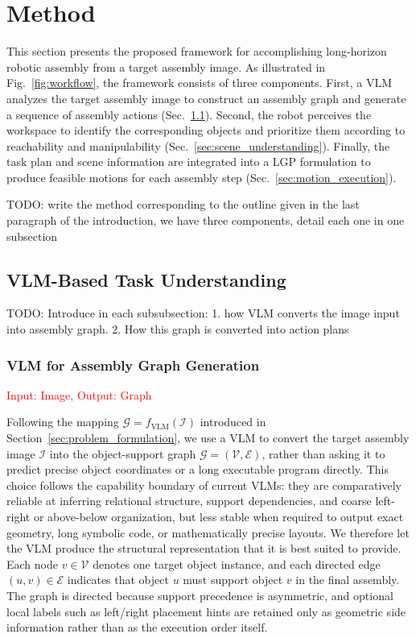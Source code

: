 \documentclass[journal]{IEEEtran}
\newcommand{\todo}[1]{{\color{red}TODO: #1}}
\begin{document}
\section{Method}


This section presents the proposed framework for accomplishing long-horizon robotic assembly from a target assembly image. 
As illustrated in Fig.~\ref{fig:workflow}, the framework consists of three components. 
First, a VLM analyzes the target assembly image to construct an assembly graph and generate a sequence of assembly actions (Sec.~\ref{sec:task_understanding}). 
Second, the robot perceives the workspace to identify the corresponding objects and prioritize them according to reachability and manipulability (Sec.~\ref{sec:scene_understanding}). 
Finally, the task plan and scene information are integrated into a LGP formulation to produce feasible motions for each assembly step (Sec.~\ref{sec:motion_execution}). 

\todo{write the method corresponding to the outline given in the last paragraph of the introduction, we have three components, detail each one in one subsection}

\subsection{VLM-Based Task Understanding}
\label{sec:task_understanding}

\todo{Introduce in each subsubsection: 1. how VLM converts the image input into assembly graph. 2. How this graph is converted into action plans}

\subsubsection{VLM for Assembly Graph Generation}
\textcolor{red}{Input: Image, Output: Graph}

Following the mapping $\mathcal{G}=f_{\mathrm{VLM}}(\mathcal{I})$ introduced in
Section~\ref{sec:problem_formulation}, we use a VLM to convert the target
assembly image $\mathcal{I}$ into the object-support graph
$\mathcal{G}=(\mathcal{V},\mathcal{E})$, rather than asking it to predict
precise object coordinates or a long executable program directly. This
choice follows the capability boundary of current VLMs: they are
comparatively reliable at inferring relational structure, support
dependencies, and coarse left-right or above-below organization, but less
stable when required to output exact geometry, long symbolic code, or
mathematically precise layouts. We therefore let the VLM produce the
structural representation that it is best suited to provide. Each node
$v \in \mathcal{V}$ denotes one target object instance, and each directed
edge $(u,v) \in \mathcal{E}$ indicates that object $u$ must support object
$v$ in the final assembly. The graph is directed because support precedence
is asymmetric, and optional local labels such as left/right placement hints
are retained only as geometric side information rather than as the
execution order itself.
\end{document}
